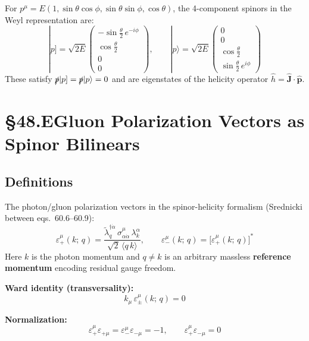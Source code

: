 \documentclass[12pt]{article}
\begin{document}
For $p^\mu = E(1,\sin\theta\cos\phi,\sin\theta\sin\phi,\cos\theta)$, the
4-component spinors in the Weyl representation are:
\begin{equation}
  |p] = \sqrt{2E}\begin{pmatrix}-\sin\tfrac\theta2\,e^{-i\phi} \\ \cos\tfrac\theta2 \\ 0 \\ 0\end{pmatrix},
  \qquad
  |p\rangle = \sqrt{2E}\begin{pmatrix}0 \\ 0 \\ \cos\tfrac\theta2 \\ \sin\tfrac\theta2\,e^{i\phi}\end{pmatrix}
  \tag{48.11}
\end{equation}
These satisfy $\slashed{p}|p]=\slashed{p}|p\rangle=0$ and are eigenstates of
the helicity operator $\hat h = \hat{\mathbf{J}}\cdot\hat{\mathbf{p}}$.

\section{§48.E\quad Gluon Polarization Vectors as Spinor Bilinears}

\subsection{Definitions}

The photon/gluon polarization vectors in the spinor-helicity formalism
(Srednicki between eqs.~60.6--60.9):
\begin{equation}
  \boxed{
    \varepsilon_+^\mu(k;\,q) = \frac{\tilde\lambda_q^{\dagger\dot\alpha}\,\sigma^\mu_{\alpha\dot\alpha}\,\lambda_k^\alpha}{\sqrt{2}\,\langle q\,k\rangle},
    \qquad
    \varepsilon_-^\mu(k;\,q) = \bigl[\varepsilon_+^\mu(k;\,q)\bigr]^*
  }
  \tag{48.12}
\end{equation}
Here $k$ is the photon momentum and $q\neq k$ is an arbitrary massless
\textbf{reference momentum} encoding residual gauge freedom.

\textbf{Ward identity (transversality):}
\begin{equation}
  k_\mu\,\varepsilon_\pm^\mu(k;\,q) = 0
  \tag{48.13}
\end{equation}

\textbf{Normalization:}
\begin{equation}
  \varepsilon_+^\mu\varepsilon_{+\mu} = \varepsilon_-^\mu\varepsilon_{-\mu} = -1,
  \qquad
  \varepsilon_+^\mu\varepsilon_{-\mu} = 0
  \tag{48.14}
\end{equation}
\end{document}
